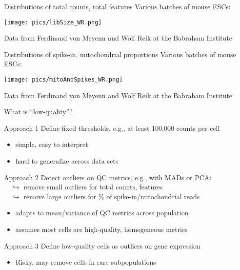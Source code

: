 \documentclass{beamer}
\begin{document}
\begin{frame}{Distributions of total counts, total features}
    Various batches of mouse ESCs:
    \begin{center}
        \texttt{[image: pics/libSize\_WR.png]}
    \end{center}
    {\tiny Data from Ferdinand von Meyenn and Wolf Reik at the Babraham Institute}
\end{frame}
    
\begin{frame}{Distributions of spike-in, mitochondrial proportions}
    Various batches of mouse ESCs:
    \begin{center}
        \texttt{[image: pics/mitoAndSpikes\_WR.png]}
    \end{center}
    {\tiny Data from Ferdinand von Meyenn and Wolf Reik at the Babraham Institute}
\end{frame}

\begin{frame}{What is ``low-quality''?}
    \begin{exampleblock}{Approach 1}
        Define fixed thresholds, e.g., at least 100,000 counts per cell
        \begin{itemize}
            \item simple, easy to interpret
            \item hard to generalize across data sets 
        \end{itemize}
    \end{exampleblock}
    \pause
    \begin{exampleblock}{Approach 2}
        Detect outliers on QC metrics, e.g., with MADs or PCA: \\
        $\quad\hookrightarrow$ remove small outliers for total counts, features \\
        $\quad\hookrightarrow$ remove large outliers for \% of spike-in/mitochondrial reads
        \begin{itemize}
            \item adapts to mean/variance of QC metrics across population
            \item assumes most cells are high-quality, homogeneous metrics
        \end{itemize}
    \end{exampleblock}
    \pause
    \begin{alertblock}{Approach 3}
        Define low-quality cells as outliers on gene expression
        \begin{itemize}
            \item Risky, may remove cells in rare subpopulations
        \end{itemize}
    \end{alertblock}
\end{frame}
\end{document}
